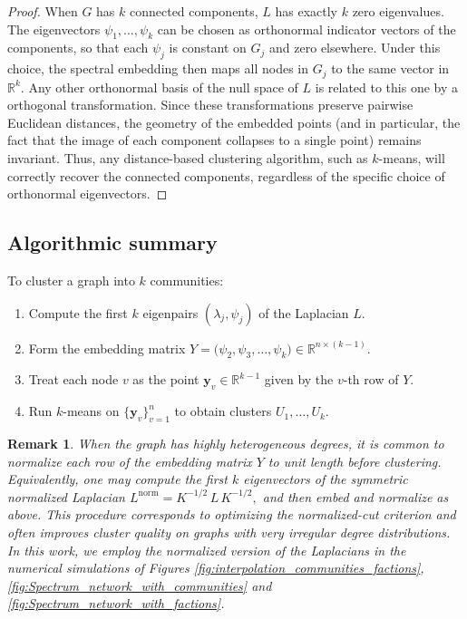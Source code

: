 \documentclass[reprint,onecolumn]{article}
\newtheorem{remark}[theorem]{Remark}
\newcommand{\R}{\mathbb{R}}
\newcommand{\1}{\mathbb{1}}
\newcommand{\y}{\mathbf{y}}
\newcommand{\0}{\mathbf{0}}
\begin{document}
\begin{proof}
When $G$ has $k$ connected components, $L$ has exactly $k$ zero eigenvalues. The eigenvectors $\psi_1,\dots,\psi_k$ can be chosen as orthonormal indicator vectors of the components, so that each $\psi_j$ is constant on $G_j$ and zero elsewhere. Under this choice, the spectral embedding then maps all nodes in $G_j$ to the same vector in $\R^{k}$.
Any other orthonormal basis of the null space of \( L \) is related to this one by a orthogonal transformation. Since these transformations preserve pairwise Euclidean distances, the geometry of the embedded points (and in particular, the fact that the image of each component collapses to a single point) remains invariant. Thus, any distance-based clustering algorithm, such as \( k \)-means, will correctly recover the connected components, regardless of the specific choice of orthonormal eigenvectors.
\end{proof}
%
\subsection{Algorithmic summary}
To cluster a graph into $k$ communities:
\begin{enumerate}
  \item Compute the first $k$ eigenpairs $(\lambda_j,\psi_j)$ of the Laplacian $L$.
  \item Form the embedding matrix 
  \(
    Y = \bigl(\psi_2,\psi_3,\dots,\psi_k\bigr)\in\R^{n\times (k-1)}.
  \)
  \item Treat each node $v$ as the point $\y_v\in\R^{k-1}$ given by the $v$-th row of $Y$.
  \item Run $k$-means on $\{\y_v\}_{v=1}^n$ to obtain clusters $U_1,\dots,U_k$.
\end{enumerate}

\begin{remark}
When the graph has highly heterogeneous degrees, it is common to normalize each row of the embedding matrix $Y$
to unit length before clustering.  Equivalently, one may compute the first $k$ eigenvectors of the \emph{symmetric normalized Laplacian}
\(
L^{\mathrm{norm}} = K^{-1/2}\,L\,K^{-1/2},
\)
and then embed and normalize as above.  This procedure corresponds to optimizing the \emph{normalized-cut} criterion and often improves cluster quality on graphs with very irregular degree distributions. In this work, we employ the normalized version of the Laplacians in the numerical simulations of Figures \ref{fig:interpolation_communities_factions}, \ref{fig:Spectrum_network_with_communities} and \ref{fig:Spectrum_network_with_factions}.
\end{remark}
%
\end{document}
